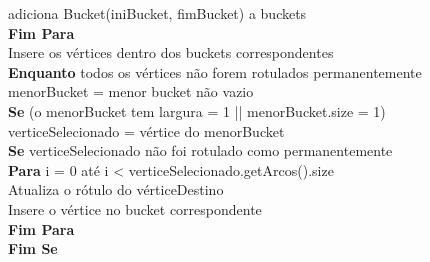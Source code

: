 {\begin{minipage}{70ex}
\vspace*{-1mm} \phantom{} \hspace{6ex} adiciona Bucket(iniBucket, fimBucket) a buckets\\
\vspace*{-1mm} \phantom{} \hspace{3ex} {\bf Fim Para}\\
\vspace*{-1mm} \phantom{} \hspace{3ex} Insere os vértices dentro dos buckets correspondentes\\
\vspace*{-1mm} \phantom{} \hspace{3ex} {\bf Enquanto} todos os vértices não forem rotulados permanentemente\\
\vspace*{-1mm} \phantom{} \hspace{6ex} menorBucket = menor bucket não vazio\\
\vspace*{-1mm} \phantom{} \hspace{6ex} {\bf Se} (o menorBucket tem largura = 1 || menorBucket.size = 1)\\
\vspace*{-1mm} \phantom{} \hspace{9ex} verticeSelecionado = vértice do menorBucket\\
\vspace*{-1mm} \phantom{} \hspace{9ex} {\bf Se} verticeSelecionado não foi rotulado como permanentemente\\
\vspace*{-1mm} \phantom{} \hspace{12ex} {\bf Para} i = 0 até i < verticeSelecionado.getArcos().size\\
\vspace*{-1mm} \phantom{} \hspace{15ex} Atualiza o rótulo do vérticeDestino\\
\vspace*{-1mm} \phantom{} \hspace{15ex} Insere o vértice no bucket correspondente\\
\vspace*{-1mm} \phantom{} \hspace{12ex} {\bf Fim Para}\\
\vspace*{-1mm} \phantom{} \hspace{9ex} {\bf Fim Se}\\

\end{minipage}}
